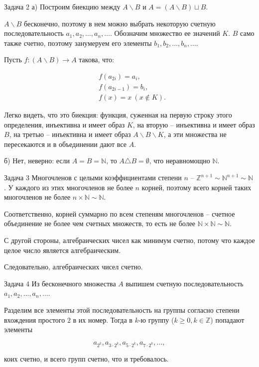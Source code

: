 \documentclass{article}
\newcommand{\N}{\mathbb{N}}
\newcommand{\Z}{\mathbb{Z}}
\renewcommand{\setminus}{\mathbin{\backslash}}
\begin{document}
	\begin{section}{Задача 2}
		а) Построим биекцию между $A \setminus B$ и $A = (A \setminus B) \sqcup B$.

		$A \setminus B$ бесконечно, поэтому в нем можно выбрать некоторую счетную последовательность $a_1, a_2, \dots, a_n, \dots$. Обозначим множество ее значений $K$. $B$ само также счетно, поэтому занумеруем его элементы $b_1, b_2, \dots, b_n, \dots$.

		Пусть $f: (A \setminus B) \to A$ такова, что:

		\begin{align*}
			& f(a_{2i}) = a_i, \\
			& f(a_{2i-1}) = b_i, \\
			& f(x) = x \ (x \not\in K).
		\end{align*}

		Легко видеть, что это биекция: функция, суженная на первую строку этого определения, инъективна и имеет образ $K$, на вторую -- инъективна и имеет образ $B$, на третью -- инъективна и имеет образ $A \setminus B \setminus K$, а эти множества не пересекаются и в объединении дают все $A$.

		б) Нет, неверно: если $A = B = \N$, то $A \triangle B = \emptyset$, что неравномощно $\N$.
	\end{section}

	\begin{section}{Задача 3}
		Многочленов с целыми коэффициентами степени $n$ -- $\mathbb{Z}^{n+1} \sim \mathbb{N}^{n+1} \sim \mathbb{N}$. У каждого из этих многочленов не более $n$ корней, поэтому всего корней таких многочленов не более $n \times \mathbb{N} \sim \mathbb{N}$.

		Соответственно, корней суммарно по всем степеням многочленов -- счетное объединение не более чем счетных множеств, то есть не более $\mathbb{N} \times \mathbb{N} \sim \mathbb{N}$.

		С другой стороны, алгебраических чисел как минимум счетно, потому что каждое целое число является алгебраическим.

		Следовательно, алгебраических чисел счетно.
	\end{section}

	\begin{section}{Задача 4}
		Из бесконечного множества $A$ выпишем счетную последовательность $a_1, a_2, \dots, a_n, \dots$.

		Разделим все элементы этой последовательность на группы согласно степени вхождения простого $2$ в их номер. Тогда в $k$-ю группу ($k \ge 0, k \in \Z$) попадают элементы

		\begin{equation*}
			a_{2^k}, a_{3 \cdot 2^k}, a_{5 \cdot 2^k}, a_{7 \cdot 2^k}, \dots,
		\end{equation*}

		коих счетно, и всего групп счетно, что и требовалось.
	\end{section}
\end{document}

